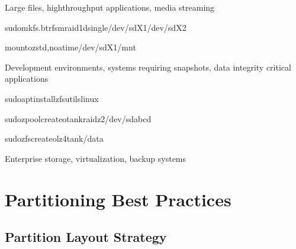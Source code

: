 \documentclass[letterpaper,10pt,english]{sphinxmanual}
\begin{document}
\sphinxAtStartPar
{} Large files, high\sphinxhyphen{}throughput applications, media streaming

\sphinxAtStartPar
{}

\begin{sphinxVerbatim}[commandchars=\\\{\}]
sudomkfs.btrfs\PYGZhy{}mraid1\PYGZhy{}dsingle/dev/sdX1/dev/sdX2

mount\PYGZhy{}ozstd,noatime/dev/sdX1/mnt
\end{sphinxVerbatim}

\sphinxAtStartPar
{} Development environments, systems requiring snapshots, data integrity critical applications

\sphinxAtStartPar
{}

\begin{sphinxVerbatim}[commandchars=\\\{\}]
sudoaptinstallzfsutils\PYGZhy{}linux

sudozpoolcreate\PYGZhy{}otankraidz2/dev/sd\PYG{o}{[}abcd\PYG{o}{]}

sudozfscreate\PYGZhy{}olz4tank/data
\end{sphinxVerbatim}

\sphinxAtStartPar
{} Enterprise storage, virtualization, backup systems


\section{Partitioning Best Practices}
\label{\detokenize{best-practices:partitioning-best-practices}}

\subsection{Partition Layout Strategy}
\label{\detokenize{best-practices:partition-layout-strategy}}
\sphinxAtStartPar
{}
\end{document}
